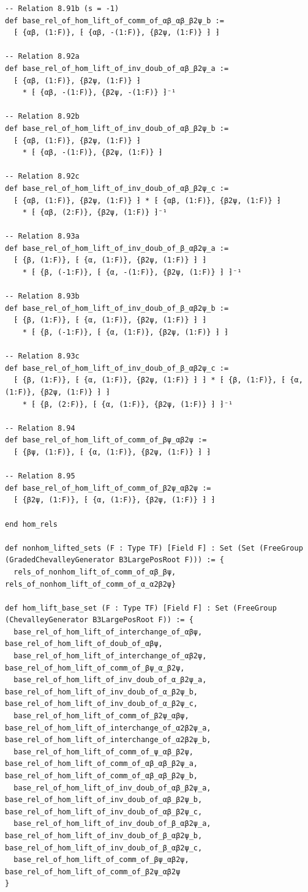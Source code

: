 \documentclass[10pt,a4paper]{article}
\begin{document}
\begin{Verbatim}
-- Relation 8.91b (s = -1)
def base_rel_of_hom_lift_of_comm_of_αβ_αβ_β2ψ_b :=
  ⁅ {αβ, (1:F)}, ⁅ {αβ, -(1:F)}, {β2ψ, (1:F)} ⁆ ⁆

-- Relation 8.92a
def base_rel_of_hom_lift_of_inv_doub_of_αβ_β2ψ_a :=
  ⁅ {αβ, (1:F)}, {β2ψ, (1:F)} ⁆
    * ⁅ {αβ, -(1:F)}, {β2ψ, -(1:F)} ⁆⁻¹

-- Relation 8.92b
def base_rel_of_hom_lift_of_inv_doub_of_αβ_β2ψ_b :=
  ⁅ {αβ, (1:F)}, {β2ψ, (1:F)} ⁆
    * ⁅ {αβ, -(1:F)}, {β2ψ, (1:F)} ⁆

-- Relation 8.92c
def base_rel_of_hom_lift_of_inv_doub_of_αβ_β2ψ_c :=
  ⁅ {αβ, (1:F)}, {β2ψ, (1:F)} ⁆ * ⁅ {αβ, (1:F)}, {β2ψ, (1:F)} ⁆
    * ⁅ {αβ, (2:F)}, {β2ψ, (1:F)} ⁆⁻¹

-- Relation 8.93a
def base_rel_of_hom_lift_of_inv_doub_of_β_αβ2ψ_a :=
  ⁅ {β, (1:F)}, ⁅ {α, (1:F)}, {β2ψ, (1:F)} ⁆ ⁆
    * ⁅ {β, (-1:F)}, ⁅ {α, -(1:F)}, {β2ψ, (1:F)} ⁆ ⁆⁻¹

-- Relation 8.93b
def base_rel_of_hom_lift_of_inv_doub_of_β_αβ2ψ_b :=
  ⁅ {β, (1:F)}, ⁅ {α, (1:F)}, {β2ψ, (1:F)} ⁆ ⁆
    * ⁅ {β, (-1:F)}, ⁅ {α, (1:F)}, {β2ψ, (1:F)} ⁆ ⁆

-- Relation 8.93c
def base_rel_of_hom_lift_of_inv_doub_of_β_αβ2ψ_c :=
  ⁅ {β, (1:F)}, ⁅ {α, (1:F)}, {β2ψ, (1:F)} ⁆ ⁆ * ⁅ {β, (1:F)}, ⁅ {α, (1:F)}, {β2ψ, (1:F)} ⁆ ⁆
    * ⁅ {β, (2:F)}, ⁅ {α, (1:F)}, {β2ψ, (1:F)} ⁆ ⁆⁻¹

-- Relation 8.94
def base_rel_of_hom_lift_of_comm_of_βψ_αβ2ψ :=
  ⁅ {βψ, (1:F)}, ⁅ {α, (1:F)}, {β2ψ, (1:F)} ⁆ ⁆

-- Relation 8.95
def base_rel_of_hom_lift_of_comm_of_β2ψ_αβ2ψ :=
  ⁅ {β2ψ, (1:F)}, ⁅ {α, (1:F)}, {β2ψ, (1:F)} ⁆ ⁆

end hom_rels

def nonhom_lifted_sets (F : Type TF) [Field F] : Set (Set (FreeGroup (GradedChevalleyGenerator B3LargePosRoot F))) := {
  rels_of_nonhom_lift_of_comm_of_αβ_βψ, rels_of_nonhom_lift_of_comm_of_α_α2β2ψ}

def hom_lift_base_set (F : Type TF) [Field F] : Set (FreeGroup (ChevalleyGenerator B3LargePosRoot F)) := {
  base_rel_of_hom_lift_of_interchange_of_αβψ, base_rel_of_hom_lift_of_doub_of_αβψ,
  base_rel_of_hom_lift_of_interchange_of_αβ2ψ, base_rel_of_hom_lift_of_comm_of_βψ_α_β2ψ,
  base_rel_of_hom_lift_of_inv_doub_of_α_β2ψ_a, base_rel_of_hom_lift_of_inv_doub_of_α_β2ψ_b, base_rel_of_hom_lift_of_inv_doub_of_α_β2ψ_c,
  base_rel_of_hom_lift_of_comm_of_β2ψ_αβψ, base_rel_of_hom_lift_of_interchange_of_α2β2ψ_a, base_rel_of_hom_lift_of_interchange_of_α2β2ψ_b,
  base_rel_of_hom_lift_of_comm_of_ψ_αβ_β2ψ, base_rel_of_hom_lift_of_comm_of_αβ_αβ_β2ψ_a, base_rel_of_hom_lift_of_comm_of_αβ_αβ_β2ψ_b,
  base_rel_of_hom_lift_of_inv_doub_of_αβ_β2ψ_a, base_rel_of_hom_lift_of_inv_doub_of_αβ_β2ψ_b, base_rel_of_hom_lift_of_inv_doub_of_αβ_β2ψ_c,
  base_rel_of_hom_lift_of_inv_doub_of_β_αβ2ψ_a, base_rel_of_hom_lift_of_inv_doub_of_β_αβ2ψ_b, base_rel_of_hom_lift_of_inv_doub_of_β_αβ2ψ_c,
  base_rel_of_hom_lift_of_comm_of_βψ_αβ2ψ, base_rel_of_hom_lift_of_comm_of_β2ψ_αβ2ψ
}


\end{Verbatim}
\end{document}
